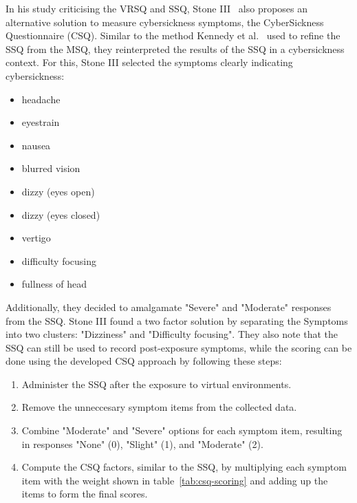 In his study criticising the VRSQ and SSQ, Stone III~\cite{Stone2017} also proposes an alternative solution to
measure cybersickness symptoms, the CyberSickness Questionnaire (CSQ).
Similar to the method Kennedy et al.\ \cite{Kennedy1993} used to refine the SSQ from the MSQ, they reinterpreted the
results of the SSQ in a cybersickness context.
For this, Stone III selected the symptoms clearly indicating cybersickness:
\begin{itemize}
    \item headache
    \item eyestrain
    \item nausea
    \item blurred vision
    \item dizzy (eyes open)
    \item dizzy (eyes closed)
    \item vertigo
    \item difficulty focusing
    \item fullness of head
\end{itemize}
Additionally, they decided to amalgamate "Severe" and "Moderate" responses from the SSQ\@.
Stone III found a two factor solution by separating the Symptoms into two clusters: "Dizziness" and
"Difficulty focusing".
They also note that the SSQ can still be used to record post-exposure symptoms, while the
scoring can be done using the developed CSQ approach by following these steps:
\begin{enumerate}
    \item Administer the SSQ after the exposure to virtual environments.
    \item Remove the unneccesary symptom items from the collected data.
    \item Combine "Moderate" and "Severe" options for each symptom item, resulting in responses "None" (0), "Slight"
    (1), and "Moderate" (2).
    \item Compute the CSQ factors, similar to the SSQ, by multiplying each symptom item with the weight shown in
    table~\ref{tab:csq-scoring} and adding up the items to form the final scores.
\end{enumerate}

